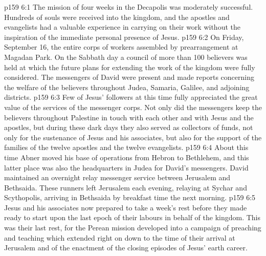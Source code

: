 \vs p159 6:1 The mission of four weeks in the Decapolis was moderately successful. Hundreds of souls were received into the kingdom, and the apostles and evangelists had a valuable experience in carrying on their work without the inspiration of the immediate personal presence of Jesus.
\vs p159 6:2 On Friday, September 16, the entire corps of workers assembled by prearrangement at Magadan Park. On the Sabbath day a council of more than 100 believers was held at which the future plans for extending the work of the kingdom were fully considered. The messengers of David were present and made reports concerning the welfare of the believers throughout Judea, Samaria, Galilee, and adjoining districts.
\vs p159 6:3 Few of Jesus’ followers at this time fully appreciated the great value of the services of the messenger corps. Not only did the messengers keep the believers throughout Palestine in touch with each other and with Jesus and the apostles, but during these dark days they also served as collectors of funds, not only for the sustenance of Jesus and his associates, but also for the support of the families of the twelve apostles and the twelve evangelists.
\vs p159 6:4 About this time Abner moved his base of operations from Hebron to Bethlehem, and this latter place was also the headquarters in Judea for David’s messengers. David maintained an overnight relay messenger service between Jerusalem and Bethsaida. These runners left Jerusalem each evening, relaying at Sychar and Scythopolis, arriving in Bethsaida by breakfast time the next morning.
\vs p159 6:5 Jesus and his associates now prepared to take a week’s rest before they made ready to start upon the last epoch of their labours in behalf of the kingdom. This was their last rest, for the Perean mission developed into a campaign of preaching and teaching which extended right on down to the time of their arrival at Jerusalem and of the enactment of the closing episodes of Jesus’ earth career.
\quizlink
